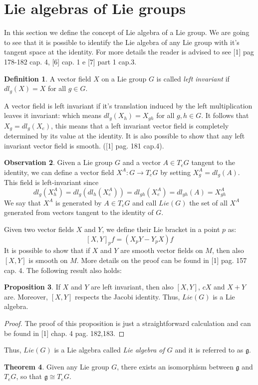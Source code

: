 \documentclass[12pt,a4paper]{report}
\theoremstyle{definition}
\newtheorem{Def}{Definition}[chapter]
\theoremstyle{Theorem}
\newtheorem{Theo}[Def]{Theorem}
\newtheorem{Prop}[Def]{Proposition}
\theoremstyle{definition}
\theoremstyle{definition}
\newtheorem{Obs}[Def]{Observation}
\begin{document}
	\section{Lie algebras of Lie groups}
	In this section we define the concept of Lie algebra of a Lie group. We are going to see that it is possible to identify the Lie algebra of any Lie group with it's tangent space at the identity. For more details the reader is advised to see [1] pag 178-182 cap. 4, [6] cap. 1 e [7] part 1 cap.3.
	\begin{Def}
		A vector field $X$ on a Lie group $G$ is called \textit{left invariant} if $dl_g(X)=X$ for all $g\in G$.
	\end{Def}
	A vector field is left invariant if it's translation induced by the left multiplication leaves it invariant: which means $dl_g(X_h)=X_{gh}$ for all $g,h\in G$.
	It follows that $X_g=dl_g(X_e)$, this means that a left invariant vector field is completely determined by its value at the identity. It is also possible to show that any left invariant vector field is smooth. ([1] pag. 181 cap.4).
	\begin{Obs} \label{Obs: 2.2}
		Given a Lie group $G$ and a vector $A\in T_eG$ tangent to the identity, we can define a vector field $X^A:G\rightarrow T_eG$ by setting $X^A_g=dl_g(A)$. This field is left-invariant since $$dl_g(X^A_h)=dl_g(dl_h(X^A_e))=dl_{gh}(X^A_e)=dl_{gh}(A)=X^A_{gh}$$
		We say that $X^A$ is generated by $A\in T_eG$ and call $Lie(G)$ the set of all $X^A$ generated from vectors tangent to the identity of $G$.	
	\end{Obs}
	Given two vector fields $X$ and $Y$, we define their Lie bracket in a point $p$ as:
	$$[X,Y]_pf=(X_pY-Y_pX)f$$
	It is possible to show that if $X$ and $Y$ are smooth vector fields on $M$, then also $[X,Y]$ is smooth on $M$. More details on the proof can be found in [1] pag. 157 cap. 4. The following result also holds:
	\begin{Prop}
		If $X$ and $Y$ are left invariant, then also $[X,Y]$, $cX$ and $X+Y$ are. Moreover, $[X,Y]$ respects the Jacobi identity. Thus, $Lie(G)$ is a Lie algebra.
	\end{Prop}
	\begin{proof}
		The proof of this proposition is just a straightforward calculation and can be found in [1] chap. 4 pag. 182,183.
	\end{proof}
	Thus, $Lie(G)$ is a Lie algebra called \textit{Lie algebra of $G$} and it is referred to as $\mathfrak{g}$.
	\begin{Theo}
		Given any Lie group $G$, there exists an isomorphism between $\mathfrak{g}$ and $T_eG$, so that $\mathfrak{g}\cong T_eG$.
	\end{Theo}
\end{document}
